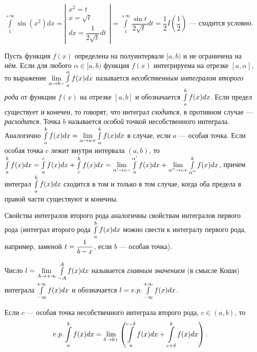 \documentclass[a4paper,10pt]{article}
\begin{document}
	\begin{exmp}
		$\int\limits_1^{+\infty}\sin(x^2)dx=\left|\begin{matrix}
		x^2=t\\x=\sqrt{t}\\dx=\dfrac{1}{2\sqrt{t}}dt
		\end{matrix}\right|=\int\limits_1^{+\infty}\dfrac{\sin t}{2\sqrt{t}}dt=\dfrac{1}{2} I\left(\dfrac{1}{2}\right)$ --- сходится условно.
	\end{exmp}
	
	\begin{defn}
		Пусть функция $f(x)$ определена на полуинтервале $[a, b)$ и не ограничена на нём.
		 Если для любого $\alpha \in [a, b)$ функция $f(x)$ интегрируема на отрезке $[a, \alpha]$,
		 то выражение $\mathop{\lim}\limits_{\alpha \to b-} \mathop{\int}\limits^{\alpha}_a f(x) dx$ называется \textit{несобственным
		 интегралом второго рода} от функции $f(x)$ на отрезке $[a, b]$ и обозначается $\mathop{\int}\limits^b_a f(x)dx$.
		 Если предел существует и конечен, то говорят, что интеграл \textit{сходится}, в противном случае
		 --- \textit{расходится}. Точка $b$ называется \textit{особой} точкой несобственного интеграла.
		 Аналогично $\intl^b_a f(x)dx \hm{=} \liml_{\alpha \to a+} \intl^b_{\alpha} f(x)dx$ в случае, если
		 $a$ --- особая точка. Если особая точка $c$ лежит внутри интервала $(a, b)$, то
		 $\intl^b_a f(x)dx \hm{=} \intl^c_a f(x)dx + \intl^b_c f(x)dx \hm{=}
		 \liml_{\alpha' \to c-} \intl^{\alpha'}_a f(x)dx + \liml_{\alpha'' \to c+} \intl^b_{\alpha''} f(x)dx$,
		 причем интеграл $\mathop{\int}\limits^b_a f(x)dx$ сходится в том и только в том случае, когда оба предела в правой
		 части существуют и конечны.
	\end{defn}
	
	\begin{note}
		Свойства интегралов второго рода аналогичны свойствам интегралов первого рода
		(интеграл второго рода $\mathop{\int}\limits^b_a f(x)dx$ можно свести к интегралу первого
		рода, например, заменой $t \hm{=} \dfrac{1}{b - x}$, если $b$ --- особая точка).
	\end{note}
	
	\begin{defn}
		Число $l \hm{=} \liml_{A \to + \infty} \intl^A_{-A} f(x)dx$ называется \textit{главным значением}
		 (в смысле Коши) интеграла $\mathop{\int}\limits^{+ \infty}_{- \infty} f(x)dx$ и обозначается
		 $l \hm{=} v.p. \intl^{+ \infty}_{- \infty} f(x)dx$.
	\end{defn}
	
	\begin{defn}
		Если $c$ --- особая точка несобственного интеграла второго рода, $c \in (a, b)$,
		 то $$v.p. \intl^b_a f(x)dx \hm{=} \liml_{\delta \to 0+} \left( \intl^{c - \delta}_a f(x)dx
		 + \intl^b_{c + \delta} f(x)dx \right).$$
	\end{defn}
	
\end{document}
